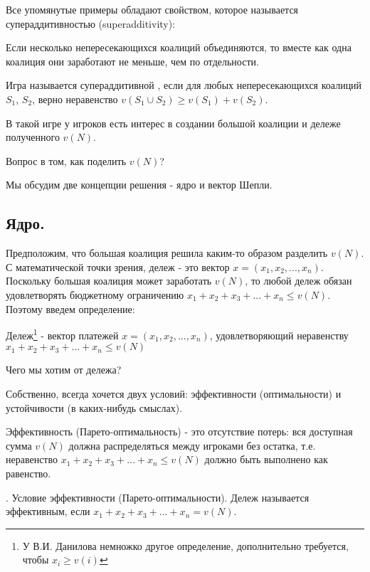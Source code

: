 Все упомянутые примеры обладают свойством, которое называется супераддитивностью (superadditivity):

Если несколько непересекающихся коалиций объединяются, то вместе как одна коалиция они заработают не меньше, чем по отдельности.

\begin{mydef}
Игра называется супераддитивной , если для любых непересекающихся коалиций $S_{1}$, $S_{2}$, верно неравенство $v(S_{1}\cup S_{2})\geq v(S_{1})+v(S_{2})$.
\end{mydef}

В такой игре у игроков есть интерес в создании большой коалиции и дележе полученного $v(N)$.

Вопрос в том, как поделить $v(N)$?

Мы обсудим две концепции решения - ядро и вектор Шепли.

\subsection{Ядро.}

Предположим, что большая коалиция решила каким-то образом разделить $v(N)$. С математической точки зрения, дележ - это вектор $x=(x_{1},x_{2},...,x_{n})$. Поскольку большая коалиция может заработать $v(N)$, то любой дележ обязан удовлетворять бюджетному ограничению $x_{1}+x_{2}+x_{3}+...+x_{n}\leq v(N)$. Поэтому введем определение:

\begin{mydef}
Дележ\footnote{У В.И. Данилова \cite{danilov:lte} немножко другое определение, дополнительно требуется, чтобы $x_{i}\geq v(i)$} - вектор платежей $x=(x_{1},x_{2},...,x_{n})$, удовлетворяющий неравенству $x_{1}+x_{2}+x_{3}+...+x_{n}\leq v(N)$
\end{mydef}


Чего мы хотим от дележа?

Собственно, всегда хочется двух условий: эффективности (оптимальности) и устойчивости (в каких-нибудь смыслах).

Эффективность (Парето-оптимальность)   - это отсутствие потерь: вся доступная сумма $v(N)$ должна распределяться между игроками без остатка, т.е. неравенство $x_{1}+x_{2}+x_{3}+...+x_{n}\leq v(N)$ должно быть выполнено как равенство.

\begin{mydef}. \label{Pareto} Условие эффективности (Парето-оптимальности). Дележ называется эффективным, если $x_{1}+x_{2}+x_{3}+...+x_{n}=v(N)$.
\end{mydef}


